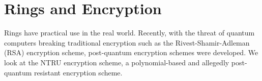 \chapter{Rings and Encryption}
Rings have practical use in the real world. Recently, with the threat of quantum computers breaking traditional encryption such as the Rivest-Shamir-Adleman (RSA) encryption scheme, post-quantum encryption schemes were developed. We look at the NTRU encryption scheme, a polynomial-based and allegedly post-quantum resistant encryption scheme.
